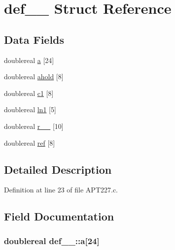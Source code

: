 \hypertarget{structdef__1__}{}\section{def\+\_\+\_\+ Struct Reference}
\label{structdef__1__}
\subsection*{Data Fields}
\begin{DoxyCompactItemize}
\item 
doublereal \hyperlink{structdef__1___a17e7c05eb0ebb0049058b65d3b1837c4}{a} \mbox{[}24\mbox{]}
\item 
doublereal \hyperlink{structdef__1___a475514b6d9ff59995020180ab23b1034}{ahold} \mbox{[}8\mbox{]}
\item 
doublereal \hyperlink{structdef__1___ab376c4daa2900edb497d12b6505f3fcf}{c1} \mbox{[}8\mbox{]}
\item 
doublereal \hyperlink{structdef__1___a933e153561646e90d549e52b6020fd4f}{ln1} \mbox{[}5\mbox{]}
\item 
doublereal \hyperlink{structdef__1___ae582f771c1762d1ac9034d57965a2fd7}{r\+\_\+\+\_\+} \mbox{[}10\mbox{]}
\item 
doublereal \hyperlink{structdef__1___aed1479e1155f74c5f056d22d3cf17d02}{ref} \mbox{[}8\mbox{]}
\end{DoxyCompactItemize}


\subsection{Detailed Description}


Definition at line 23 of file A\+P\+T227.\+c.



\subsection{Field Documentation}
\subsubsection[{\texorpdfstring{a}{a}}]{\setlength{\rightskip}{0pt plus 5cm}doublereal def\+\_\+\_\+\+::a\mbox{[}24\mbox{]}}\hypertarget{structdef__1___a17e7c05eb0ebb0049058b65d3b1837c4}{}\label{structdef__1___a17e7c05eb0ebb0049058b65d3b1837c4}



